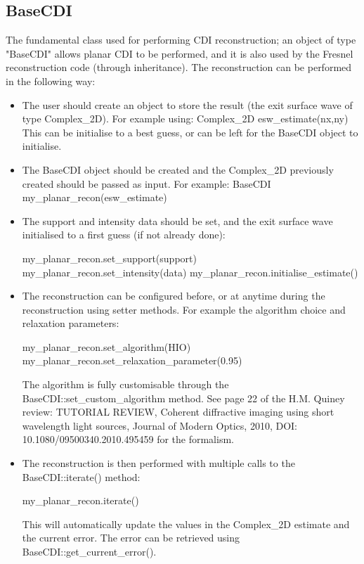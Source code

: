 \documentclass[]{cxs-software}
\begin{document}
\subsection{BaseCDI}
The fundamental class used for performing CDI reconstruction; an
object of type "BaseCDI" allows planar CDI to be performed, and it is
also used by the Fresnel reconstruction code (through inheritance).
The reconstruction can be performed in the following way:

\begin{itemize}

\item The user should create an object to store the result (the exit
  surface wave of type Complex\_2D). For example using: Complex\_2D
  esw\_estimate(nx,ny) This can be initialise to a best guess, or can
  be left for the BaseCDI object to initialise.

\item The BaseCDI object should be created and the Complex\_2D
  previously created should be passed as input. For example: BaseCDI
  my\_planar\_recon(esw\_estimate)

\item The support and intensity data should be set, and the exit
  surface wave initialised to a first guess (if not already done):
  \begin{myverbatim}
my_planar_recon.set_support(support) 
my_planar_recon.set_intensity(data) 
my_planar_recon.initialise_estimate()
\end{myverbatim}

\item The reconstruction can be configured before, or at anytime
  during the reconstruction using setter methods. For example the
  algorithm choice and relaxation parameters:
\begin{myverbatim}
my_planar_recon.set_algorithm(HIO) 
my_planar_recon.set_relaxation_parameter(0.95) 
\end{myverbatim}
The algorithm is fully customisable through the
BaseCDI::set\_custom\_algorithm method. See page 22 of the H.M. Quiney
review: TUTORIAL REVIEW, Coherent diffractive imaging using short
wavelength light sources, Journal of Modern Optics, 2010, DOI:
10.1080/09500340.2010.495459 for the formalism.

\item The reconstruction is then performed with multiple calls to the
  BaseCDI::iterate() method:
\begin{myverbatim}
my_planar_recon.iterate() 
\end{myverbatim}
This will automatically update the values in the Complex\_2D estimate
and the current error. The error can be retrieved using
BaseCDI::get\_current\_error().
\end{itemize}
\end{document}
